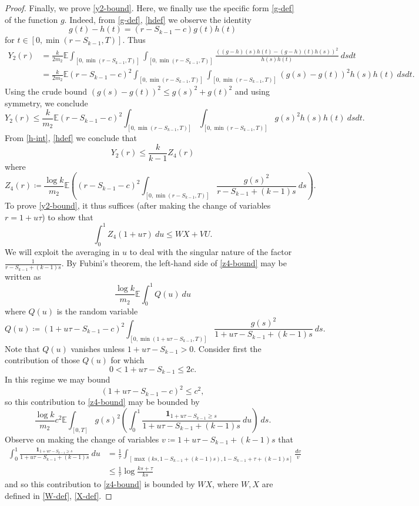\documentclass{bmcart}
\theoremstyle{plain}
\theoremstyle{definition}
\newcommand\E{\mathbb{E}}
\newcommand{\onef}{\mathbf{1}}
\begin{document}
\begin{proof}
Finally, we prove \eqref{y2-bound}.  Here, we finally use the specific form \eqref{g-def} of the function $g$.  Indeed, from \eqref{g-def}, \eqref{hdef} we observe the identity
$$ g(t) - h(t) = (r - S_{k-1} - c) g(t) h(t)$$
for $t \in [0, \min(r-S_{k-1},T)]$.  Thus
\begin{align*}
Y_2(r) &= \frac{k}{2 m_2} \E \int_{[0,\min(r-S_{k-1},T)]} \int_{[0,\min(r-S_{k-1},T)]} \frac{((g-h)(s) h(t)-(g-h)(t) h(s))^2}{h(s) h(t)}\ ds dt \\
&= \frac{k}{2 m_2} \E (r - S_{k-1} - c)^2 \int_{[0,\min(r-S_{k-1},T)]} \int_{[0,\min(r-S_{k-1},T)]} (g(s)-g(t))^2 h(s) h(t)\ ds dt.
\end{align*}
Using the crude bound $(g(s)-g(t))^2 \leq g(s)^2+g(t)^2$ and using symmetry, we conclude
$$Y_2(r) \leq \frac{k}{m_2} \E (r - S_{k-1} - c)^2 \int_{[0,\min(r-S_{k-1},T)]} \int_{[0,\min(r-S_{k-1},T)]} g(s)^2 h(s) h(t)\ ds dt.$$
From \eqref{h-int}, \eqref{hdef} we conclude that
$$ Y_2(r) \leq \frac{k}{k-1} Z_4(r)$$
where
$$ Z_4(r) \coloneqq \frac{\log k}{m_2} \E\left( (r - S_{k-1} - c)^2 \int_{[0,\min(r-S_{k-1},T)]} \frac{g(s)^2}{r-S_{k-1}+(k-1)s}\ ds \right) .$$
To prove \eqref{y2-bound}, it thus suffices (after making the change of variables $r = 1 + u \tau$) to show that
\begin{equation}\label{z4-bound}
 \int_0^1 Z_4(1+u\tau)\ du \leq WX+VU.
\end{equation}
We will exploit the averaging in $u$ to deal with the singular nature of the factor $\frac{1}{r-S_{k-1}+(k-1)s}$.  By Fubini's theorem, the left-hand side of \eqref{z4-bound} may be written as
$$ \frac{\log k}{m_2} \E \int_0^1 Q(u)\ du $$
where $Q(u)$ is the random variable
$$ Q(u) \coloneqq (1+u\tau - S_{k-1} - c)^2 \int_{[0,\min(1+u\tau-S_{k-1},T)]} \frac{g(s)^2}{1+u\tau-S_{k-1}+(k-1)s}\ ds.$$
Note that $Q(u)$ vanishes unless $1+u\tau-S_{k-1} > 0$.  Consider first the contribution of those $Q(u)$ for which
$$ 0 < 1+u\tau-S_{k-1} \leq 2c.$$
In this regime we may bound
$$ (1+u\tau-S_{k-1}-c)^2 \leq c^2,$$
so this contribution to \eqref{z4-bound} may be bounded by
$$ \frac{\log k}{m_2} c^2 \E \int_{[0,T]} g(s)^2 \left(\int_0^1 \frac{\onef_{1+u\tau-S_{k-1} \geq s}}{1+u\tau-S_{k-1}+(k-1)s}\ du\right)\ ds.$$
Observe on making the change of variables $v \coloneqq 1 + u\tau - S_{k-1} + (k-1)s$ that 
\begin{align*}
\int_0^1 \frac{\onef_{1+u\tau-S_{k-1} \geq s}}{1+u\tau-S_{k-1}+(k-1)s}\ du &= \frac{1}{\tau} \int_{[\max(ks, 1-S_{k-1}+(k-1)s), 1-S_{k-1}+\tau+(k-1)s]} \frac{dv}{v} \\
&\leq \frac{1}{\tau} \log \frac{ks+\tau}{ks}
\end{align*}
and so this contribution to \eqref{z4-bound} is bounded by $WX$, where $W,X$ are defined in \eqref{W-def}, \eqref{X-def}.


\end{proof}
\end{document}
